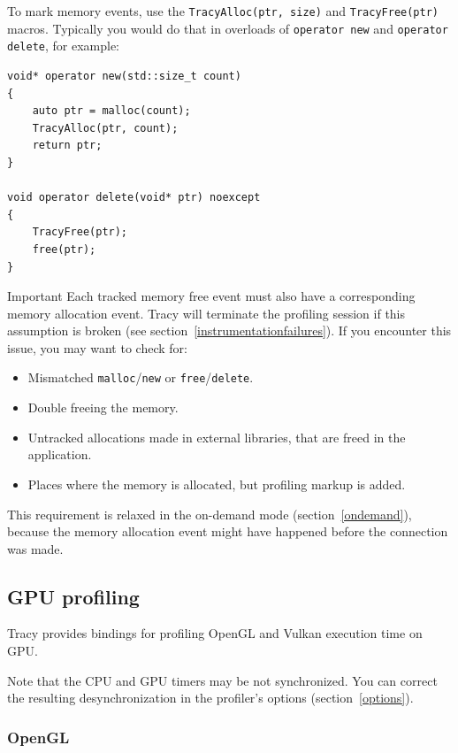 \documentclass[hidelinks,titlepage,a4paper]{article}
\begin{document}
To mark memory events, use the \texttt{TracyAlloc(ptr, size)} and \texttt{TracyFree(ptr)} macros. Typically you would do that in overloads of \texttt{operator new} and \texttt{operator delete}, for example:

\begin{lstlisting}
void* operator new(std::size_t count)
{
    auto ptr = malloc(count);
    TracyAlloc(ptr, count);
    return ptr;
}

void operator delete(void* ptr) noexcept
{
    TracyFree(ptr);
    free(ptr);
}
\end{lstlisting}

\begin{bclogo}[
noborder=true,
couleur=black!5,
logo=\bcbombe
]{Important}
Each tracked memory free event must also have a corresponding memory allocation event. Tracy will terminate the profiling session if this assumption is broken (see section~\ref{instrumentationfailures}). If you encounter this issue, you may want to check for:

\begin{itemize}
\item Mismatched \texttt{malloc}/\texttt{new} or \texttt{free}/\texttt{delete}.
\item Double freeing the memory.
\item Untracked allocations made in external libraries, that are freed in the application.
\item Places where the memory is allocated, but profiling markup is added.
\end{itemize}

This requirement is relaxed in the on-demand mode (section~\ref{ondemand}), because the memory allocation event might have happened before the connection was made.
\end{bclogo}

\subsection{GPU profiling}
\label{gpuprofiling}

Tracy provides bindings for profiling OpenGL and Vulkan execution time on GPU.

Note that the CPU and GPU timers may be not synchronized. You can correct the resulting desynchronization in the profiler's options (section~\ref{options}).

\subsubsection{OpenGL}
\end{document}
